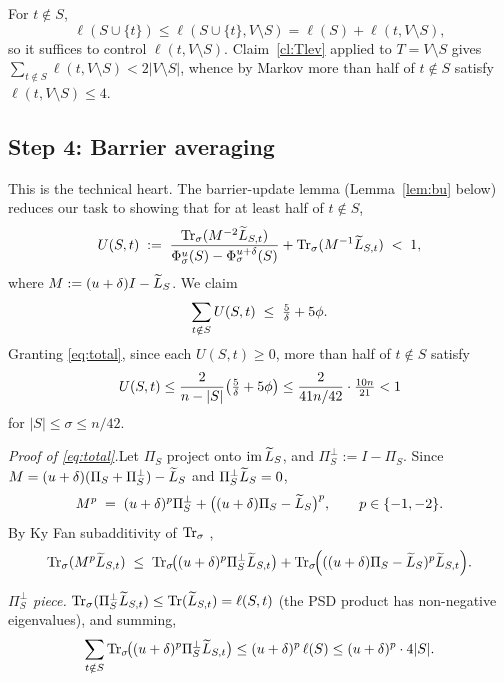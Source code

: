 \documentclass[11pt]{article}
\begin{document}
For $t\notin S$,
\[
  \ell(S\cup\{t\}) \le \ell(S\cup\{t\},V\setminus S)
                   = \ell(S)+\ell(t,V\setminus S),
\]
so it suffices to control $\ell(t,V\setminus S)$. Claim~\ref{cl:Tlev} applied
to $T=V\setminus S$ gives
$\sum_{t\notin S}\ell(t,V\setminus S)<2|V\setminus S|$, whence by Markov more
than half of $t\notin S$ satisfy $\ell(t,V\setminus S)\le 4$.

\subsection*{Step 4: Barrier averaging}

This is the technical heart. The barrier-update lemma (Lemma~\ref{lem:bu}
below) reduces our task to showing that for at least half of $t\notin S$,
\begin{equation}\label{eq:U}
  U(S,t) \;:=\;
  \frac{\operatorname{Tr}_{\sigma}(M^{-2}\widetilde{L}_{S,t})}{\Phi^u_\sigma(S)-\Phi^{u+\delta}_\sigma(S)}
   + \operatorname{Tr}_{\sigma}(M^{-1}\widetilde{L}_{S,t}) \;<\; 1,
\end{equation}
where $M:=(u+\delta)I-\widetilde{L}_S$. We claim
\begin{equation}\label{eq:total}
  \sum_{t\notin S} U(S,t) \;\le\; \tfrac{5}{\delta} + 5\phi.
\end{equation}
Granting \eqref{eq:total}, since each $U(S,t)\ge 0$, more than half of
$t\notin S$ satisfy
\[
  U(S,t)\le\frac{2}{n-|S|}\!\left(\tfrac{5}{\delta}+5\phi\right)
        \le \frac{2}{41n/42}\cdot\tfrac{10n}{21} < 1
\]
for $|S|\le\sigma\le n/42$.

\medskip
\noindent\emph{Proof of \eqref{eq:total}.}\quad Let $\Pi_S$ project onto
$\operatorname{im}\widetilde{L}_S$, and $\Pi_S^\perp:=I-\Pi_S$. Since
$M=(u+\delta)(\Pi_S+\Pi_S^\perp)-\widetilde{L}_S$ and $\Pi_S^\perp\widetilde{L}_S=0$,
\[
  M^p \;=\; (u+\delta)^p\Pi_S^\perp + \bigl((u+\delta)\Pi_S-\widetilde{L}_S\bigr)^p,
  \qquad p\in\{-1,-2\}.
\]
By Ky Fan subadditivity of $\operatorname{Tr}_{\sigma}$ \cite[Thm.~4.3.47a]{HJ12},
\begin{equation}\label{eq:split}
  \operatorname{Tr}_{\sigma}(M^p\widetilde{L}_{S,t}) \;\le\;
  \operatorname{Tr}_{\sigma}\!\bigl((u+\delta)^p\Pi_S^\perp\widetilde{L}_{S,t}\bigr)
  + \operatorname{Tr}_{\sigma}\!\Bigl(((u+\delta)\Pi_S-\widetilde{L}_S)^p\widetilde{L}_{S,t}\Bigr).
\end{equation}

\smallskip
\emph{$\Pi_S^\perp$ piece.}\quad
$\operatorname{Tr}_{\sigma}(\Pi_S^\perp\widetilde{L}_{S,t})\le\operatorname{Tr}(\widetilde{L}_{S,t})=\ell(S,t)$ (the PSD product has
non-negative eigenvalues), and summing,
\[
  \sum_{t\notin S}\operatorname{Tr}_{\sigma}\!\bigl((u+\delta)^p\Pi_S^\perp\widetilde{L}_{S,t}\bigr)
   \le (u+\delta)^p\,\ell(S)\le (u+\delta)^p\cdot 4|S|.
\]
\end{document}
